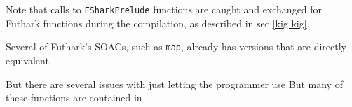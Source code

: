 Note that calls to \texttt{FSharkPrelude} functions are caught and exchanged for
Futhark functions during the \fshark{} compilation, as described in sec \ref{kig
  kig}.



Several of Futhark's SOACs, such as \texttt{map}, already has \fsharp{}
versions that are directly equivalent.

But there are several issues with just letting the \fshark{} programmer use 
But many of these \fsharp{} functions are
contained in 











